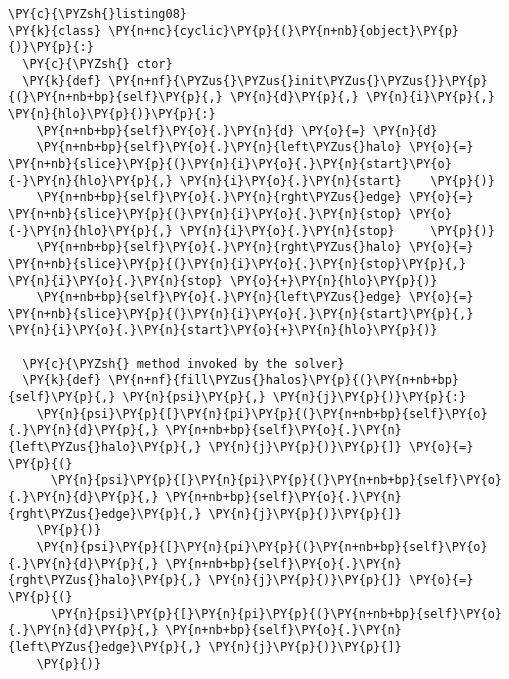 \begin{Verbatim}[commandchars=\\\{\}]
\PY{c}{\PYZsh{}listing08}
\PY{k}{class} \PY{n+nc}{cyclic}\PY{p}{(}\PY{n+nb}{object}\PY{p}{)}\PY{p}{:}
  \PY{c}{\PYZsh{} ctor}
  \PY{k}{def} \PY{n+nf}{\PYZus{}\PYZus{}init\PYZus{}\PYZus{}}\PY{p}{(}\PY{n+nb+bp}{self}\PY{p}{,} \PY{n}{d}\PY{p}{,} \PY{n}{i}\PY{p}{,} \PY{n}{hlo}\PY{p}{)}\PY{p}{:} 
    \PY{n+nb+bp}{self}\PY{o}{.}\PY{n}{d} \PY{o}{=} \PY{n}{d}
    \PY{n+nb+bp}{self}\PY{o}{.}\PY{n}{left\PYZus{}halo} \PY{o}{=} \PY{n+nb}{slice}\PY{p}{(}\PY{n}{i}\PY{o}{.}\PY{n}{start}\PY{o}{-}\PY{n}{hlo}\PY{p}{,} \PY{n}{i}\PY{o}{.}\PY{n}{start}    \PY{p}{)}
    \PY{n+nb+bp}{self}\PY{o}{.}\PY{n}{rght\PYZus{}edge} \PY{o}{=} \PY{n+nb}{slice}\PY{p}{(}\PY{n}{i}\PY{o}{.}\PY{n}{stop} \PY{o}{-}\PY{n}{hlo}\PY{p}{,} \PY{n}{i}\PY{o}{.}\PY{n}{stop}     \PY{p}{)}
    \PY{n+nb+bp}{self}\PY{o}{.}\PY{n}{rght\PYZus{}halo} \PY{o}{=} \PY{n+nb}{slice}\PY{p}{(}\PY{n}{i}\PY{o}{.}\PY{n}{stop}\PY{p}{,}      \PY{n}{i}\PY{o}{.}\PY{n}{stop} \PY{o}{+}\PY{n}{hlo}\PY{p}{)}
    \PY{n+nb+bp}{self}\PY{o}{.}\PY{n}{left\PYZus{}edge} \PY{o}{=} \PY{n+nb}{slice}\PY{p}{(}\PY{n}{i}\PY{o}{.}\PY{n}{start}\PY{p}{,}     \PY{n}{i}\PY{o}{.}\PY{n}{start}\PY{o}{+}\PY{n}{hlo}\PY{p}{)}

  \PY{c}{\PYZsh{} method invoked by the solver}
  \PY{k}{def} \PY{n+nf}{fill\PYZus{}halos}\PY{p}{(}\PY{n+nb+bp}{self}\PY{p}{,} \PY{n}{psi}\PY{p}{,} \PY{n}{j}\PY{p}{)}\PY{p}{:}
    \PY{n}{psi}\PY{p}{[}\PY{n}{pi}\PY{p}{(}\PY{n+nb+bp}{self}\PY{o}{.}\PY{n}{d}\PY{p}{,} \PY{n+nb+bp}{self}\PY{o}{.}\PY{n}{left\PYZus{}halo}\PY{p}{,} \PY{n}{j}\PY{p}{)}\PY{p}{]} \PY{o}{=} \PY{p}{(}
      \PY{n}{psi}\PY{p}{[}\PY{n}{pi}\PY{p}{(}\PY{n+nb+bp}{self}\PY{o}{.}\PY{n}{d}\PY{p}{,} \PY{n+nb+bp}{self}\PY{o}{.}\PY{n}{rght\PYZus{}edge}\PY{p}{,} \PY{n}{j}\PY{p}{)}\PY{p}{]}
    \PY{p}{)}
    \PY{n}{psi}\PY{p}{[}\PY{n}{pi}\PY{p}{(}\PY{n+nb+bp}{self}\PY{o}{.}\PY{n}{d}\PY{p}{,} \PY{n+nb+bp}{self}\PY{o}{.}\PY{n}{rght\PYZus{}halo}\PY{p}{,} \PY{n}{j}\PY{p}{)}\PY{p}{]} \PY{o}{=} \PY{p}{(}
      \PY{n}{psi}\PY{p}{[}\PY{n}{pi}\PY{p}{(}\PY{n+nb+bp}{self}\PY{o}{.}\PY{n}{d}\PY{p}{,} \PY{n+nb+bp}{self}\PY{o}{.}\PY{n}{left\PYZus{}edge}\PY{p}{,} \PY{n}{j}\PY{p}{)}\PY{p}{]}
    \PY{p}{)}


\end{Verbatim}
